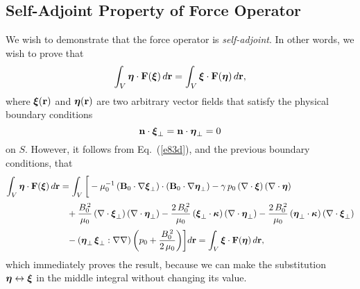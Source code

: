 \documentclass[12pt,prb,aps,notitlepage]{revtex4-1}
\newcommand{\bxi}{\mbox{\boldmath$\xi$}}
\newcommand{\bta}{\mbox{\boldmath$\eta$}}
\newcommand{\bkappa}{\mbox{\boldmath$\kappa$}}
\begin{document}
\subsection{Self-Adjoint Property of Force Operator}
We wish to demonstrate that the force operator is {\em self-adjoint}. In other words, we wish to prove that 
\begin{equation}\label{e26}
\int_V \bta\cdot{\bf F}(\bxi)\,d{\bf r} = \int_V \bxi\cdot {\bf F}(\bta)\,d{\bf r},
\end{equation}
where  $\bxi({\bf r})$ and $\bta({\bf r})$ are two arbitrary vector fields that satisfy the 
physical boundary conditions
\begin{equation}\label{e27}
{\bf n}\cdot\bxi_\perp={\bf n}\cdot\bta_\perp=0
\end{equation}
on $S$.
However, it follows from Eq.~(\ref{e83d}), and the previous boundary conditions, that
 \begin{align}
\int_V \bta\cdot{\bf F}(\bxi)\,d{\bf r} &=\int_V \bigg[- \mu_0^{-1}\,({\bf B}_0\cdot\nabla\bxi_\perp)\cdot
 ({\bf B}_0\cdot\nabla\bta_\perp)-\gamma\,p_0\,(\nabla\cdot\bxi)\,(\nabla\cdot\bta)
\nonumber\\[0.5ex]
 &\phantom{=}+\frac{B_0^{\,2}}{\mu_0}\,(\nabla\cdot\bxi_\perp)\,(\nabla\cdot\bta_\perp) -\frac{2\,B_0^{\,2}}{\mu_0}\,(\bxi_\perp\cdot\bkappa)\, (\nabla\cdot\bta_\perp)-\frac{2\,B_0^{\,2}}{\mu_0}\,(\bta_\perp\cdot\bkappa)\,(\nabla\cdot\bxi_\perp)\nonumber\\[0.5ex]
 &\phantom{=}
 -(\bta_\perp\,\bxi_\perp : \nabla\nabla)\left(p_0 + \frac{B_0^{\,2}}{2\,\mu_0}\right)\biggr]d{\bf r}=\int_V \bxi\cdot{\bf F}(\bta)\,d{\bf r},
\end{align}
which immediately proves the result, because we can make the substitution $\bta\leftrightarrow \bxi$ in the middle integral without
changing its value. 
\end{document}
